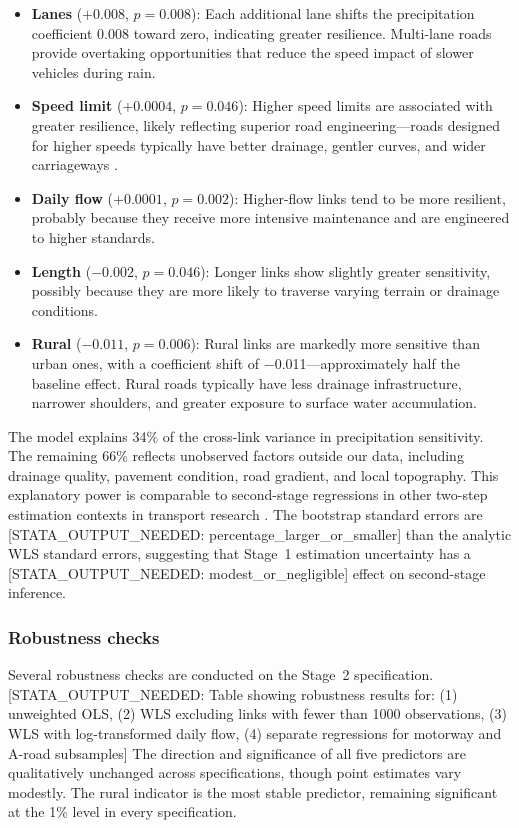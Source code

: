 \documentclass[review]{elsarticle}
\begin{document}
\begin{itemize}
    \item \textbf{Lanes} ($+0.008$, $p = 0.008$): Each additional lane shifts the precipitation coefficient 0.008 toward zero, indicating greater resilience. Multi-lane roads provide overtaking opportunities that reduce the speed impact of slower vehicles during rain.
    \item \textbf{Speed limit} ($+0.0004$, $p = 0.046$): Higher speed limits are associated with greater resilience, likely reflecting superior road engineering---roads designed for higher speeds typically have better drainage, gentler curves, and wider carriageways \citep{raccagni2024urban}.
    \item \textbf{Daily flow} ($+0.0001$, $p = 0.002$): Higher-flow links tend to be more resilient, probably because they receive more intensive maintenance and are engineered to higher standards.
    \item \textbf{Length} ($-0.002$, $p = 0.046$): Longer links show slightly greater sensitivity, possibly because they are more likely to traverse varying terrain or drainage conditions.
    \item \textbf{Rural} ($-0.011$, $p = 0.006$): Rural links are markedly more sensitive than urban ones, with a coefficient shift of $-$0.011---approximately half the baseline effect. Rural roads typically have less drainage infrastructure, narrower shoulders, and greater exposure to surface water accumulation.
\end{itemize}

The model explains 34\% of the cross-link variance in precipitation sensitivity. The remaining 66\% reflects unobserved factors outside our data, including drainage quality, pavement condition, road gradient, and local topography. This explanatory power is comparable to second-stage regressions in other two-step estimation contexts in transport research \citep{pulugurtha2021aadt}. The bootstrap standard errors are [STATA\_OUTPUT\_NEEDED: percentage\_larger\_or\_smaller] than the analytic WLS standard errors, suggesting that Stage~1 estimation uncertainty has a [STATA\_OUTPUT\_NEEDED: modest\_or\_negligible] effect on second-stage inference.

\subsubsection{Robustness checks}

Several robustness checks are conducted on the Stage~2 specification. [STATA\_OUTPUT\_NEEDED: Table showing robustness results for: (1) unweighted OLS, (2) WLS excluding links with fewer than 1000 observations, (3) WLS with log-transformed daily flow, (4) separate regressions for motorway and A-road subsamples] The direction and significance of all five predictors are qualitatively unchanged across specifications, though point estimates vary modestly. The rural indicator is the most stable predictor, remaining significant at the 1\% level in every specification.
\end{document}
